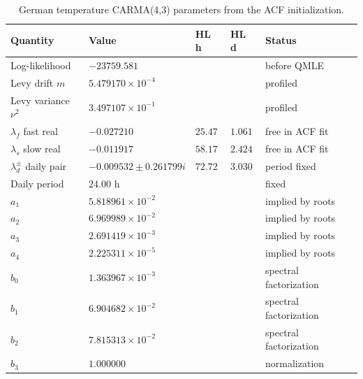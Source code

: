 \begin{table}[!htbp]
  \centering
  \caption{German temperature CARMA(4,3) parameters from the ACF initialization.}
  \label{tab:temperature-carma-acf-init}
  \begin{tabular}{@{}lllll@{}}
    \toprule
    Quantity & Value & HL h & HL d & Status \\
    \midrule
    Log-likelihood & \(-23759.581\) & & & before QMLE \\
    Levy drift \(m\) & \(5.479170{\times}10^{-4}\) & & & profiled \\
    Levy variance \(\nu^2\) & \(3.497107{\times}10^{-1}\) & & & profiled \\
    \midrule
    \(\lambda_f\) fast real & \(-0.027210\) & \(25.47\) & \(1.061\) & free in ACF fit \\
    \(\lambda_s\) slow real & \(-0.011917\) & \(58.17\) & \(2.424\) & free in ACF fit \\
    \(\lambda_d^\pm\) daily pair & \(-0.009532\pm0.261799i\) & \(72.72\) & \(3.030\) & period fixed \\
    Daily period & \(24.00\) h & & & fixed \\
    \midrule
    \(a_1\) & \(5.818961{\times}10^{-2}\) & & & implied by roots \\
    \(a_2\) & \(6.969989{\times}10^{-2}\) & & & implied by roots \\
    \(a_3\) & \(2.691419{\times}10^{-3}\) & & & implied by roots \\
    \(a_4\) & \(2.225311{\times}10^{-5}\) & & & implied by roots \\
    \midrule
    \(b_0\) & \(1.363967{\times}10^{-3}\) & & & spectral factorization \\
    \(b_1\) & \(6.904682{\times}10^{-2}\) & & & spectral factorization \\
    \(b_2\) & \(7.815313{\times}10^{-2}\) & & & spectral factorization \\
    \(b_3\) & \(1.000000\) & & & normalization \\
    \bottomrule
  \end{tabular}
\end{table}

